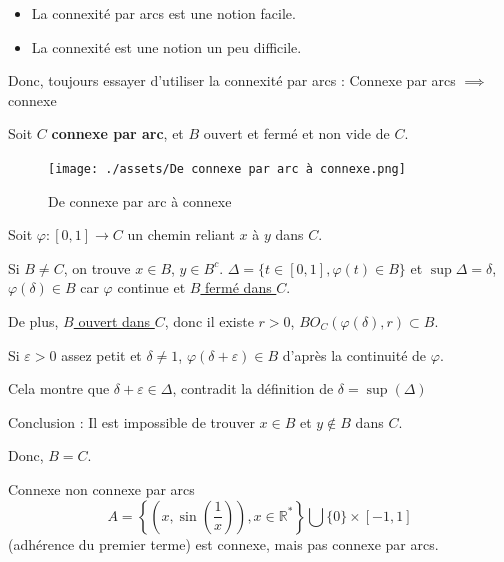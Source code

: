 \begin{note}
\begin{itemize}
    \item La connexité par arcs est une notion facile.
    \item La connexité est une notion un peu difficile.
\end{itemize}

Donc, toujours essayer d'utiliser la connexité par arcs : Connexe par arcs $\implies$ connexe
\end{note}
\begin{myproof}
Soit $C$ \textbf{connexe par arc}, et $B$ ouvert et fermé et non vide de $C$.
\begin{figure}[H] %
    \centering
    \texttt{[image: ./assets/De connexe par arc à connexe.png]}
    \caption{De connexe par arc à connexe}
    \label{fig:De-connexe-par-arc-à-connexe}
\end{figure}

Soit $\varphi:[0,1]\to C$ un chemin reliant $x$ à $y$ dans  $C$.

Si  $B \ne C$, on trouve  $x \in B$,  $y \in B^{c}$.
$\Delta = \{t \in [0,1], \varphi(t) \in B\}$ et $\sup \Delta = \delta$,  $\varphi(\delta) \in B$ car  $\varphi$ continue et \underline{$B$ fermé dans $C$}.

De plus, \underline{$B$ ouvert dans $C$}, donc il existe $r >0$, $BO_C(\varphi(\delta),r)\subset B$.

Si $\varepsilon >0$ assez petit et $\delta \ne 1$, $\varphi(\delta+\varepsilon) \in B$ d'après la continuité de  $\varphi$.

Cela montre que $\delta+ \varepsilon \in \Delta$, contradit la définition de  $\delta = \sup (\Delta)$

Conclusion : Il est impossible de trouver  $x\in B$ et  $y \not\in B$ dans  $C$.

Donc,  $B=C$.
\end{myproof}


\begin{Example}{Connexe non connexe par arcs}{}
    $$A = \left\{\left(x, \sin\left(\frac{1}{x} \right)\right), x\in \mathbb{R} ^{*}\right\}\bigcup \{0\} \times [-1,1]$$ (adhérence du premier terme) est connexe, mais pas connexe par arcs.
\end{Example}

